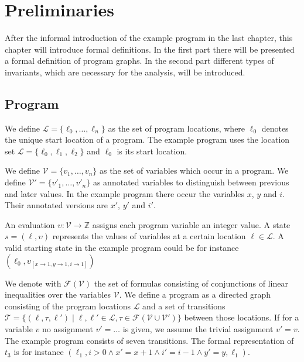\section{Preliminaries}
\label{sec:preliminaries}

After the informal introduction of the example program in the last chapter, this chapter will introduce formal definitions.
In the first part there will be presented a formal definition of program graphs.
In the second part different types of invariants, which are necessary for the analysis, will be introduced.

\subsection{Program}

We define $\mathcal{L} = \lbrace \ell_0, \dots, \ell_n \rbrace$ as the set of program locations, where $\ell_0$ denotes the unique start location of a program.
The example program uses the location set $\mathcal{L} = \lbrace \ell_0 , \ell_1 , \ell_2 \rbrace$ and $\ell_0$ is its start location.

We define $\mathcal{V} = \lbrace v_1, \dots, v_n \rbrace$ as the set of variables which occur in a program.
We define $\mathcal{V}' = \lbrace v'_1, \dots, v'_n \rbrace$ as annotated variables to distinguish between previous and later values.
In the example program there occur the variables $x$, $y$ and $i$.
Their annotated versions are $x'$, $y'$ and $i'$.

An evaluation $\upsilon: \mathcal{V} \rightarrow \mathbb{Z}$ assigns each program variable an integer value.
A state $s = (\ell, \upsilon)$ represents the values of variables at a certain location $\ell \in \mathcal{L}$.
A valid starting state in the example program could be for instance $(\ell_0, \upsilon_{[x \rightarrow 1, y \rightarrow 1, i \rightarrow 1]})$

We denote with $\mathcal{F}(\mathcal{V})$ the set of formulas consisting of conjunctions of linear inequalities over the variables $\mathcal{V}$.
We define a program as a directed graph consisting of the program locations $\mathcal{L}$ and a set of transitions $\mathcal{T} = \lbrace (\ell, \tau, \ell') \mid \ell, \ell' \in \mathcal{L}, \tau \in \mathcal{F}(\mathcal{V} \cup \mathcal{V}') \rbrace$ between those locations.
If for a variable $v$ no assignment $v' = \dots$ is given, we assume the trivial assignment $v' = v$.
The example program consists of seven transitions. The formal representation of $t_3$ is for instance $(\ell_1, i > 0 \wedge x' = x + 1 \wedge i' = i - 1 \wedge y' = y,\ell_1)$.

